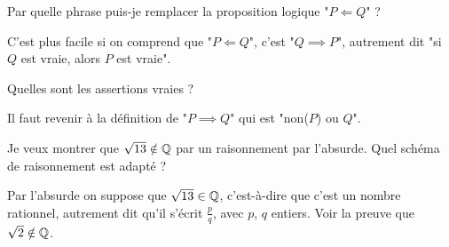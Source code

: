 \begin{question}
Par quelle phrase puis-je remplacer la proposition logique "$P \Longleftarrow Q$" ?
\begin{answers}



\end{answers}
\begin{explanations}
C'est plus facile si on comprend que "$P \Longleftarrow Q$", c'est "$Q \implies P$", autrement dit "si $Q$ est vraie, alors $P$ est vraie".
\end{explanations}
\end{question}


\begin{question}
Quelles sont les assertions vraies ?
\begin{answers}



\end{answers}
\begin{explanations}
Il faut revenir à la définition de "$P \implies Q$" qui est "non($P$) ou $Q$".
\end{explanations}
\end{question}


\begin{question}
Je veux montrer que $\sqrt{13} \notin \mathbb{Q}$ par un raisonnement par l'absurde. Quel schéma de raisonnement est adapté ?
\begin{answers}


    
\end{answers}
\begin{explanations}
Par l'absurde on suppose que $\sqrt{13} \in \mathbb{Q}$, c'est-à-dire que c'est un nombre rationnel, autrement dit qu'il s'écrit $\frac{p}{q}$, avec $p$, $q$ entiers. Voir la preuve que $\sqrt{2} \notin \mathbb{Q}$.
\end{explanations}
\end{question}





